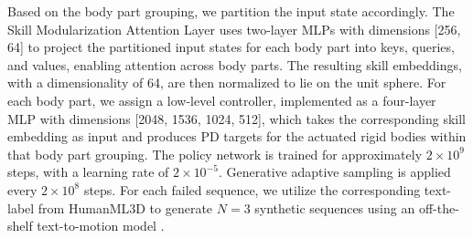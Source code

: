 \noindent Based on the body part grouping, we partition the input state accordingly. The Skill Modularization Attention Layer uses two-layer MLPs with dimensions [256, 64] to project the partitioned input states for each body part into keys, queries, and values, enabling attention across body parts. The resulting skill embeddings, with a dimensionality of 64, are then normalized to lie on the unit sphere. For each body part, we assign a low-level controller, implemented as a four-layer MLP with dimensions [2048, 1536, 1024, 512], which takes the corresponding skill embedding as input and produces PD targets for the actuated rigid bodies within that body part grouping. The policy network is trained for approximately $2 \times 10^9$ steps, with a learning rate of $2 \times 10^{-5}$. Generative adaptive sampling is applied every $2 \times 10^8$ steps. For each failed sequence, we utilize the corresponding text-label from HumanML3D \cite{Guo_2022_CVPR} to generate $N=3$ synthetic sequences using an off-the-shelf text-to-motion model \cite{tevet2023human}.\\

